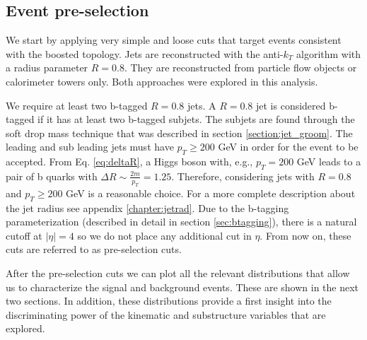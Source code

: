 
\subsection{Event pre-selection}


We start by applying very simple and loose cuts that target events consistent with the boosted topology. Jets are reconstructed with the anti-$k_T$ algorithm with a radius parameter $R=0.8$. They are reconstructed from particle flow objects or calorimeter towers only. Both approaches were explored in this analysis.

We require at least two b-tagged $R=0.8$ jets. A $R=0.8$ jet is considered b-tagged if it has at least two b-tagged subjets. The subjets are found through the soft drop mass technique that was described in section \ref{section:jet_groom}. The leading and sub leading jets must have $p_T\geq200$ GeV in order for the event to be accepted. From Eq. \ref{eq:deltaR}, a Higgs boson with, e.g., $p_T=200$ GeV leads to a pair of b quarks with $\Delta R\sim \frac{2m}{p_T}=1.25$. Therefore, considering jets with $R=0.8$ and $p_T\geq 200$ GeV is a reasonable choice. For a more complete description about the jet radius see appendix \ref{chapter:jetrad}. Due to the b-tagging parameterization (described in detail in section \ref{sec:btagging}), there is a natural cutoff at $|\eta|=4$ so we do not place any additional cut in $\eta$. From now on, these cuts are referred to as pre-selection cuts.

After the pre-selection cuts we can plot all the relevant distributions that allow us to characterize the signal and background events. These are shown in the next two sections. In addition, these distributions provide a first insight into the discriminating power of the kinematic and substructure variables that are explored.  

